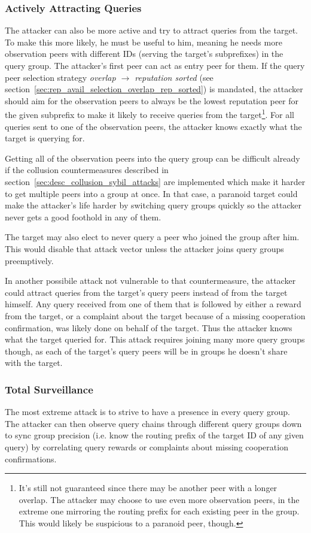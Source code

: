\subsubsection{Actively Attracting Queries}
The attacker can also be more active and try to attract queries from the target.
To make this more likely, he must be useful to him, meaning he needs more
observation peers with different IDs (serving the target's subprefixes) in the
query group. The attacker's first peer can act as entry peer for them. If the
query peer selection strategy \emph{overlap $\rightarrow$ reputation sorted}
(see section~\ref{sec:rep_avail_selection_overlap_rep_sorted}) is mandated, the
attacker should aim for the observation peers to always be the lowest reputation
peer for the given subprefix to make it likely to receive queries from the
target\footnote{It's still not guaranteed since there may be another peer with a
longer overlap. The attacker may choose to use even more observation peers, in
the extreme one mirroring the routing prefix for each existing peer in the
group. This would likely be suspicious to a paranoid peer, though.}. For all
queries sent to one of the observation peers, the attacker knows exactly what
the target is querying for.

Getting all of the observation peers into the query group can be difficult
already if the collusion countermeasures described in
section~\ref{sec:desc_collusion_sybil_attacks} are implemented which make it
harder to get multiple peers into a group at once. In that case, a paranoid
target could make the attacker's life harder by switching query groups quickly
so the attacker never gets a good foothold in any of them.

The target may also elect to never query a peer who joined the group after him.
This would disable that attack vector unless the attacker joins query groups
preemptively.

In another possibile attack not vulnerable to that countermeasure, the attacker
could attract queries from the target's query peers instead of from the target
himself. Any query received from one of them that is followed by either a reward
from the target, or a complaint about the target because of a missing
cooperation confirmation, was likely done on behalf of the target. Thus the
attacker knows what the target queried for. This attack requires joining many
more query groups though, as each of the target's query peers will be in groups
he doesn't share with the target.

\subsubsection{Total Surveillance}
The most extreme attack is to strive to have a presence in every query group.
The attacker can then observe query chains through different query groups down
to sync group precision (i.e. know the routing prefix of the target ID of any
given query) by correlating query rewards or complaints about missing
cooperation confirmations.

